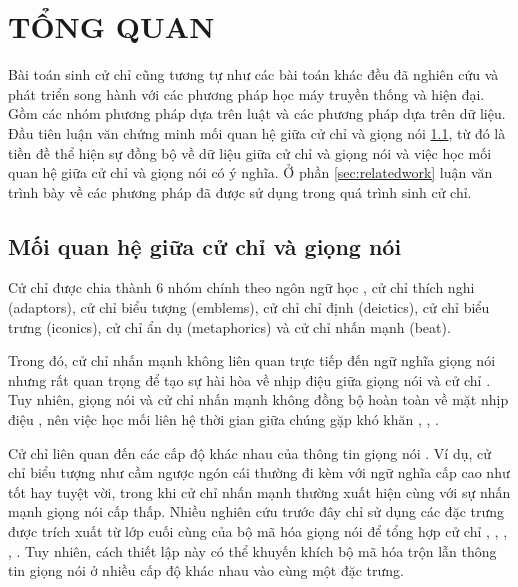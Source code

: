 \chapter{TỔNG QUAN}
\label{Chapter2}

Bài toán sinh cử chỉ cũng tương tự như các bài toán khác đều đã nghiên cứu và phát triển song hành với các phương pháp học máy truyền thống và hiện đại. Gồm các nhóm phương pháp dựa trên luật và các phương pháp dựa trên dữ liệu.  Đầu tiên luận văn chứng minh mối quan hệ giữa cử chỉ và giọng nói \ref{sec:relationspeechandgesture}, từ đó là tiền đề thể hiện sự đồng bộ về dữ liệu giữa cử chỉ và giọng nói và việc học mối quan hệ giữa cử chỉ và giọng nói có ý nghĩa. Ở phần \ref{sec:relatedwork} luận văn trình bày về các phương pháp đã được sử dụng trong quá trình sinh cử chỉ.

\section{Mối quan hệ giữa cử chỉ và giọng nói}
\label{sec:relationspeechandgesture}

Cử chỉ được chia thành 6 nhóm chính theo ngôn ngữ học \cite{ekman1969repertoire}, \cite{sebeok2011advances} cử chỉ thích nghi (adaptors), cử chỉ biểu tượng (emblems), cử chỉ chỉ định (deictics), cử chỉ biểu trưng (iconics), cử chỉ ẩn dụ (metaphorics) và cử chỉ nhấn mạnh (beat).

 Trong đó, cử chỉ nhấn mạnh không liên quan trực tiếp đến ngữ nghĩa giọng nói \cite{kipp2005gesture} nhưng rất quan trọng để tạo sự hài hòa về nhịp điệu giữa giọng nói và cử chỉ  \cite{sebeok2011advances} . Tuy nhiên, giọng nói và cử chỉ nhấn mạnh không đồng bộ hoàn toàn về mặt nhịp điệu \cite{mcclave1994gestural}, nên việc học mối liên hệ thời gian giữa chúng gặp khó khăn \cite{bhattacharya2021speech2affectivegestures}, \cite{kucherenko2020gesticulator}, \cite{yoon2020speech}.

Cử chỉ liên quan đến các cấp độ khác nhau của thông tin giọng nói \cite{sebeok2011advances}. Ví dụ, cử chỉ biểu tượng như cầm ngược ngón cái thường đi kèm với ngữ nghĩa cấp cao như tốt hay tuyệt vời, trong khi cử chỉ nhấn mạnh thường xuất hiện cùng với sự nhấn mạnh giọng nói cấp thấp. Nhiều nghiên cứu trước đây chỉ sử dụng các đặc trưng được trích xuất từ lớp cuối cùng của bộ mã hóa giọng nói để tổng hợp cử chỉ \cite{alexanderson2020style},  \cite{bhattacharya2021speech2affectivegestures}, \cite{kucherenko2021large}, \cite{qian2021speech},  \cite{yoon2022genea}. Tuy nhiên, cách thiết lập này có thể khuyến khích bộ mã hóa trộn lẫn thông tin giọng nói ở nhiều cấp độ khác nhau vào cùng một đặc trưng.

